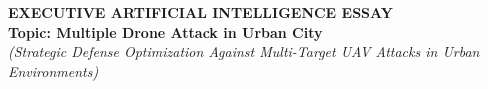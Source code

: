 \documentclass[../main.tex]{subfiles}
\begin{document}

\begin{center}
    \textbf{\LARGE EXECUTIVE ARTIFICIAL INTELLIGENCE ESSAY} \\
    \vspace{0.2cm}
    \textbf{\large Topic: Multiple Drone Attack in Urban City} \\
    \textit{(Strategic Defense Optimization Against Multi-Target UAV Attacks in Urban Environments)}
\end{center}

\vspace{0.5cm}
\end{document}
